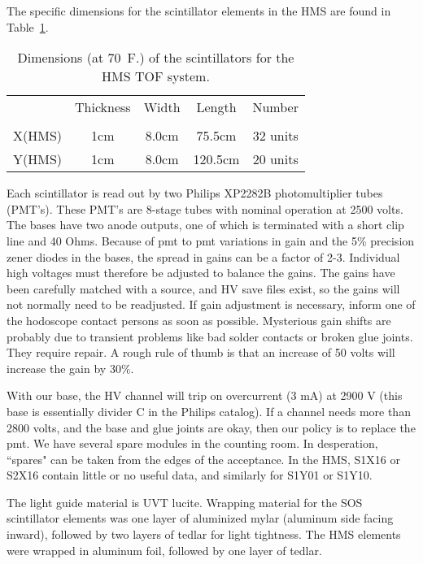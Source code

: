 {	The specific dimensions for the scintillator elements in the HMS
are found in Table~\ref{tab:tof_scintillators}.
\begin{table}
\caption{Dimensions (at 70~F.) of the scintillators for the HMS TOF system.
\label{tab:tof_scintillators}}
\begin{center}
  \begin{tabular}{ccccc}
	&Thickness	&Width		&Length		&Number	\\
	&		&		&		&	\\
\hline
X(HMS)	&	1cm	&	8.0cm	&	75.5cm	&32 units\\
Y(HMS)	&	1cm	&	8.0cm	&	120.5cm	&20 units\\
  \end{tabular}
\end{center}
\end{table}
Each scintillator is read out by two Philips XP2282B photomultiplier
tubes (PMT's). These PMT's are 8-stage tubes with nominal operation at
2500 volts. The bases have two anode outputs, one of which is terminated with a
short clip line and 40 Ohms.  Because of pmt to pmt variations in gain and the
5\% precision zener diodes in the bases, the spread in gains can be a factor of
2-3. Individual high voltages must therefore be adjusted to balance the gains.
The gains have been carefully matched with a source, and HV save files exist,
so the gains will not normally need to be readjusted. If gain adjustment is
necessary, inform one of the hodoscope contact persons as soon as possible.
Mysterious gain shifts are probably due to transient problems like bad solder
contacts or broken glue joints. They require repair. A rough rule of thumb is
that an increase of 50 volts will increase the gain by 30\%.

With our base, the HV channel will trip on overcurrent (3 mA) at 2900 V
(this base is essentially divider C in the Philips catalog). If a channel needs
more than 2800 volts, and the base and glue joints are okay, then our policy
is to replace the pmt. We have several spare modules in the counting room.
In desperation, ``spares" can be taken from the edges of the acceptance. In the
HMS, S1X16 or S2X16 contain little or no useful data, and similarly for S1Y01
or S1Y10.

	The light guide material is UVT lucite.  Wrapping material for the SOS scintillator elements was one layer of
aluminized mylar (aluminum side facing inward), followed by two layers of
tedlar for light tightness. The HMS elements were wrapped in aluminum foil,
followed by one layer of tedlar.

}
